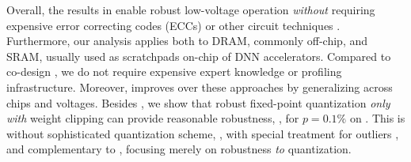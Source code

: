 Overall, the results in  enable robust low-voltage operation \emph{without} requiring expensive error correcting codes (ECCs) or other circuit techniques \cite{ReagenISCA2016,ChandramoorthyHPCA2019}. Furthermore, our analysis applies both to DRAM, commonly off-chip, and SRAM, usually used as scratchpads on-chip of DNN accelerators. Compared to co-design \cite{KimDATE2018,KoppulaMICRO2019}, we do not require expensive expert knowledge or profiling infrastructure. Moreover, \Random improves over these approaches by generalizing across chips and voltages.
Besides \Random, we show that robust fixed-point quantization \emph{only with} weight clipping can provide reasonable robustness, \eg, for $p = 0.1\%$ on \CifarT. This is without sophisticated quantization scheme, \eg, with special treatment for outliers \cite{ZhuangCVPR2018,SungARXIV2015,ParkISCA2018}, and complementary to  \cite{MurthyARXIV2019,MerollaARXIV2016,SungARXIV2015,AlizadehICLR2020}, focusing merely on robustness \emph{to} quantization.
